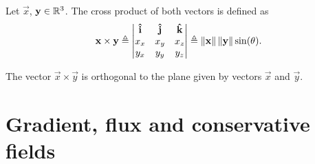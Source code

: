 \begin{defn}
    Let $\vec{x}$, $\vec{y}\in\R^3$. The cross product of both vectors is defined as
    \begin{equation}
        \mathbf{x}\times\mathbf{y}\triangleq\begin{vmatrix}
            \mathbf{\hat{i}} & \mathbf{\hat{j}} & \mathbf{\hat{k}} \\
            x_x & x_y & x_z \\
            y_x & y_y & y_z
        \end{vmatrix} \triangleq\left\Vert \mathbf{x} \right\Vert\left\Vert \mathbf{y} \right\Vert\sin(\theta).
    \end{equation}
\end{defn}

\begin{remark}
    The vector $\vec{x}\times\vec{y}$ is orthogonal to the plane given by vectors $\vec{x}$ and $\vec{y}$.
\end{remark}

\section{Gradient, flux and conservative fields}

